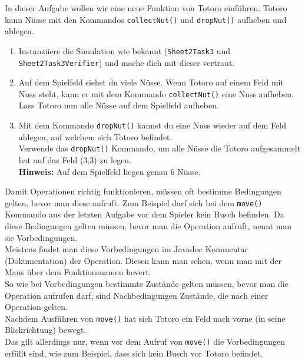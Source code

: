 

In dieser Aufgabe wollen wir eine neue Funktion von Totoro einführen.
Totoro kann Nüsse mit den Kommandos \lstinline{collectNut()} und \lstinline{dropNut()} aufheben und ablegen.

\begin{enumerate}
\item Instanziiere die Simulation wie bekannt (\lstinline{Sheet2Task3} und \lstinline{Sheet2Task3Verifier}) und mache dich mit dieser vertraut.
\item Auf dem Spielfeld siehst du viele Nüsse.
Wenn Totoro auf einem Feld mit Nuss steht, kann er mit dem Kommando \lstinline{collectNut()} eine Nuss aufheben.\\
Lass Totoro nun alle Nüsse auf dem Spielfeld aufheben.
\item Mit dem Kommando \lstinline{dropNut()} kannst du eine Nuss wieder auf dem Feld ablegen, auf welchem sich Totoro befindet.\\
Verwende das \lstinline{dropNut()} Kommando, um alle Nüsse die Totoro aufgesammelt hat auf das Feld (3,3) zu legen.\\
\textbf{Hinweis:} Auf dem Spielfeld liegen genau 6 Nüsse.
\end{enumerate}


\begin{Infobox}
    Damit Operationen richtig funktionieren, müssen oft bestimme Bedingungen gelten, bevor man diese aufruft.
Zum Beispiel darf sich bei dem \lstinline{move()} Kommando aus der letzten Aufgabe vor dem Spieler kein Busch befinden.
Da diese Bedingungen gelten müssen, bevor man die Operation aufruft, nennt man sie Vorbedingungen.\\
Meistens findet man diese Vorbedingungen im Javadoc Kommentar (Dokumentation) der Operation. 
Diesen kann man sehen, wenn man mit der Maus über dem Funktionsnamen hovert.\\

So wie bei Vorbedingungen bestimmte Zustände gelten müssen, bevor man die Operation aufrufen darf, sind Nachbedingungen Zustände, die nach einer Operation gelten.\\
Nachdem Ausführen von \lstinline{move()} hat sich Totoro ein Feld nach vorne (in seine Blickrichtung) bewegt.\\
Das gilt allerdings nur, wenn vor dem Aufruf von \lstinline{move()} die Vorbedingungen erfüllt sind, wie zum Beispiel, dass sich kein Busch vor Totoro befindet.\\


\end{Infobox}

